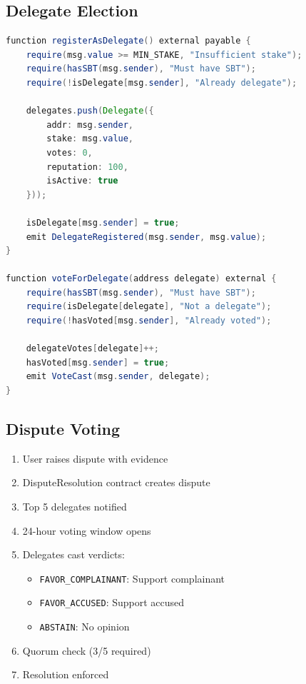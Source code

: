 \documentclass[12pt]{report}
\theoremstyle{plain}
\theoremstyle{definition}
\theoremstyle{remark}
\begin{document}
\subsection{Delegate Election}

\begin{lstlisting}[language=Java, caption=DPoS Delegate Registration]
function registerAsDelegate() external payable {
    require(msg.value >= MIN_STAKE, "Insufficient stake");
    require(hasSBT(msg.sender), "Must have SBT");
    require(!isDelegate[msg.sender], "Already delegate");
    
    delegates.push(Delegate({
        addr: msg.sender,
        stake: msg.value,
        votes: 0,
        reputation: 100,
        isActive: true
    }));
    
    isDelegate[msg.sender] = true;
    emit DelegateRegistered(msg.sender, msg.value);
}

function voteForDelegate(address delegate) external {
    require(hasSBT(msg.sender), "Must have SBT");
    require(isDelegate[delegate], "Not a delegate");
    require(!hasVoted[msg.sender], "Already voted");
    
    delegateVotes[delegate]++;
    hasVoted[msg.sender] = true;
    emit VoteCast(msg.sender, delegate);
}
\end{lstlisting}

\subsection{Dispute Voting}

\begin{enumerate}
    \item User raises dispute with evidence
    \item DisputeResolution contract creates dispute
    \item Top 5 delegates notified
    \item 24-hour voting window opens
    \item Delegates cast verdicts:
    \begin{itemize}
        \item \texttt{FAVOR\_COMPLAINANT}: Support complainant
        \item \texttt{FAVOR\_ACCUSED}: Support accused
        \item \texttt{ABSTAIN}: No opinion
    \end{itemize}
    \item Quorum check (3/5 required)
    \item Resolution enforced
\end{enumerate}
\end{document}
